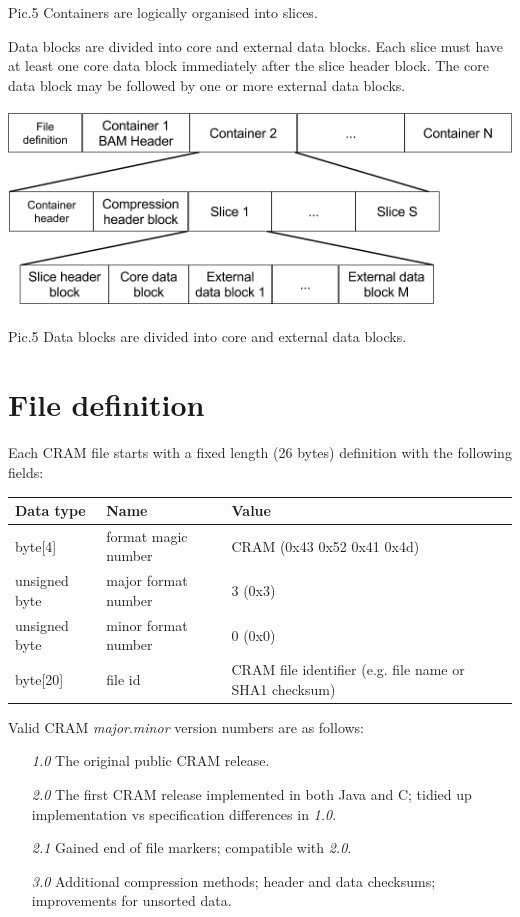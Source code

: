 \documentclass[a4paper]{article}
\begin{document}
Pic.5 Containers are logically organised into slices.

Data blocks are divided into core and external data blocks. Each slice must have 
at least one core data block immediately after the slice header block. The core 
data block may be followed by one or more external data blocks.

\includegraphics[width=392pt, height=149pt, keepaspectratio=true]{img/CRAMFileFormat2-1-fig006.png}

Pic.5 Data blocks are divided into core and external data blocks. 

\section{\textbf{File definition}}

Each CRAM file starts with a fixed length (26 bytes) definition with the following 
fields:

\begin{tabular}{|l|l|l|}
\hline
\textbf{Data type} & \textbf{Name} & \textbf{Value}\tabularnewline
\hline
byte[4] & format magic number & CRAM (0x43 0x52 0x41 0x4d)\tabularnewline
\hline
unsigned byte & major format number & 3 (0x3)\tabularnewline
\hline
unsigned byte & minor format number & 0 (0x0)\tabularnewline
\hline
byte[20] & file id & CRAM file identifier (e.g. file name or SHA1 checksum)\tabularnewline
\hline
\end{tabular}

Valid CRAM \textit{major}.\textit{minor} version numbers are as follows:

\begin{itemize}
\item[\textit{1.0}]
The original public CRAM release.

\item[\textit{2.0}]
The first CRAM release implemented in both Java and C; tidied up
implementation vs specification differences in \textit{1.0}.

\item[\textit{2.1}]
Gained end of file markers; compatible with \textit{2.0}.

\item[\textit{3.0}]
Additional compression methods; header and data checksums;
improvements for unsorted data.
\end {itemize}
\end{document}

